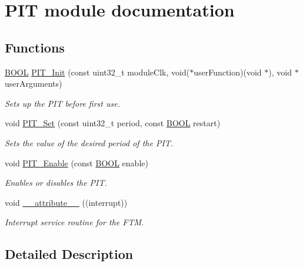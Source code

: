 \hypertarget{group___p_i_t__module}{}\section{P\+I\+T module documentation}
\label{group___p_i_t__module}
\subsection*{Functions}
\begin{DoxyCompactItemize}
\item 
\hyperlink{types_8h_a3e5b8192e7d9ffaf3542f1210aec18dd}{B\+O\+O\+L} \hyperlink{group___p_i_t__module_ga324fde178f3d126aa0d9edfc1cde998c}{P\+I\+T\+\_\+\+Init} (const uint32\+\_\+t module\+Clk, void($\ast$user\+Function)(void $\ast$), void $\ast$user\+Arguments)
\begin{DoxyCompactList}\small\item\em Sets up the P\+I\+T before first use. \end{DoxyCompactList}\item 
void \hyperlink{group___p_i_t__module_ga7215d2d552020338339fa5b0436989ce}{P\+I\+T\+\_\+\+Set} (const uint32\+\_\+t period, const \hyperlink{types_8h_a3e5b8192e7d9ffaf3542f1210aec18dd}{B\+O\+O\+L} restart)
\begin{DoxyCompactList}\small\item\em Sets the value of the desired period of the P\+I\+T. \end{DoxyCompactList}\item 
void \hyperlink{group___p_i_t__module_ga656354c3316748827c2a4629d3e056de}{P\+I\+T\+\_\+\+Enable} (const \hyperlink{types_8h_a3e5b8192e7d9ffaf3542f1210aec18dd}{B\+O\+O\+L} enable)
\begin{DoxyCompactList}\small\item\em Enables or disables the P\+I\+T. \end{DoxyCompactList}\item 
void \hyperlink{group___p_i_t__module_ga445500277ba0e363873b34cffc015745}{\+\_\+\+\_\+attribute\+\_\+\+\_\+} ((interrupt))
\begin{DoxyCompactList}\small\item\em Interrupt service routine for the F\+T\+M. \end{DoxyCompactList}\end{DoxyCompactItemize}


\subsection{Detailed Description}


